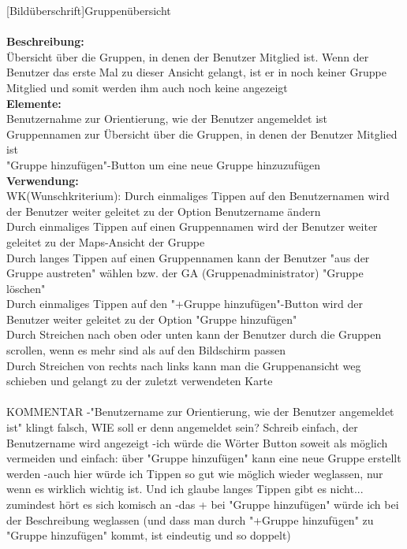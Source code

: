 [Bildüberschrift]Gruppenübersicht\\ \\
\textbf{Beschreibung:}\\
Übersicht über die Gruppen, in denen der Benutzer Mitglied ist. Wenn der Benutzer das erste Mal zu dieser Ansicht gelangt, ist er in noch keiner Gruppe Mitglied und somit werden ihm auch noch keine angezeigt\\
\textbf{Elemente:}\\
Benutzernahme zur Orientierung, wie der Benutzer angemeldet ist\\
Gruppennamen zur Übersicht über die Gruppen, in denen der Benutzer Mitglied ist\\
"Gruppe hinzufügen"-Button um eine neue Gruppe hinzuzufügen\\
\textbf{Verwendung:}\\
WK(Wunschkriterium): Durch einmaliges Tippen auf den Benutzernamen wird der Benutzer weiter geleitet zu der Option Benutzername ändern\\
Durch einmaliges Tippen auf einen Gruppennamen wird der Benutzer weiter geleitet zu der Maps-Ansicht der Gruppe\\
Durch langes Tippen auf einen Gruppennamen kann der Benutzer "aus der Gruppe austreten" wählen bzw. der GA (Gruppenadministrator) "Gruppe löschen"\\
Durch einmaliges Tippen auf den "+Gruppe hinzufügen"-Button wird der Benutzer weiter geleitet zu der Option "Gruppe hinzufügen"\\
Durch Streichen nach oben oder unten kann der Benutzer durch die Gruppen scrollen, wenn es mehr sind als auf den Bildschirm passen\\
Durch Streichen von rechts nach links kann man die Gruppenansicht weg schieben und gelangt zu der zuletzt verwendeten Karte\\ \\

KOMMENTAR
-"Benutzername zur Orientierung, wie der Benutzer angemeldet ist" klingt falsch, WIE soll er denn angemeldet sein? Schreib einfach, der Benutzername wird angezeigt
-ich würde die Wörter Button soweit als möglich vermeiden und einfach: über "Gruppe hinzufügen" kann eine neue Gruppe erstellt werden
-auch hier würde ich Tippen so gut wie möglich wieder weglassen, nur wenn es wirklich wichtig ist. Und ich glaube langes Tippen gibt es nicht... zumindest hört es sich komisch an
-das + bei "Gruppe hinzufügen" würde ich bei der Beschreibung weglassen (und dass man durch "+Gruppe hinzufügen" zu "Gruppe hinzufügen" kommt, ist eindeutig und so doppelt)


